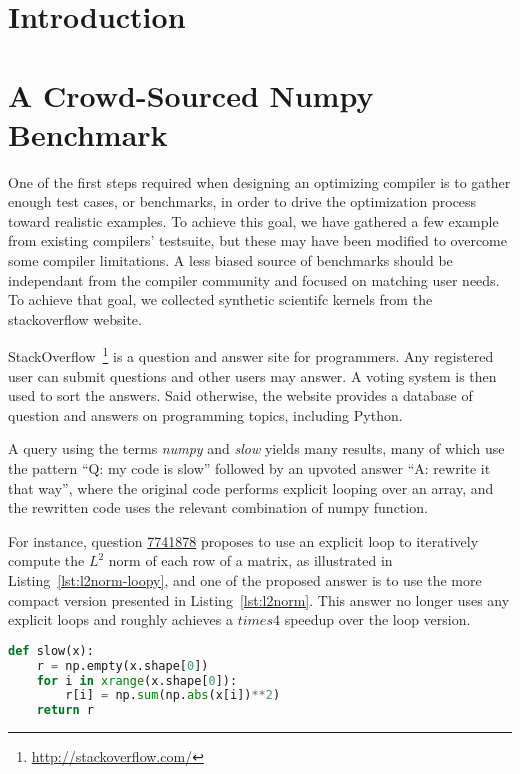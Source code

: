 \documentclass[10pt, preprint]{sigplanconf}
\begin{document}
\section{Introduction}

\cite{rossum97, scipy}

\section{A Crowd-Sourced Numpy Benchmark}

One of the first steps required when designing an optimizing compiler is to
gather enough test cases, or benchmarks, in order to drive the optimization
process toward realistic examples. To achieve this goal, we have gathered a few
example from existing compilers' testsuite, but these may have been modified to
overcome some compiler limitations. A less biased source of benchmarks should
be independant from the compiler community and focused on matching user needs.
To achieve that goal, we collected synthetic scientifc kernels from the
stackoverflow website.

StackOverflow~\footnote{\url{http://stackoverflow.com/}} is a question and
answer site for programmers. Any registered user can submit questions and other
users may answer. A voting system is then used to sort the answers. Said
otherwise, the website provides a database of question and answers on
programming topics, including Python.

A query using the terms \emph{numpy} and \emph{slow} yields many results, many
of which use the pattern ``Q: my code is slow'' followed by an upvoted answer
``A: rewrite it that way'', where the original code performs explicit looping
over an array, and the rewritten code uses the relevant combination of numpy
function.

For instance, question \href{http://stackoverflow.com/questions/7741878}{7741878}
proposes to use an explicit loop to iteratively compute the $L^2$ norm of each
row of a matrix, as illustrated in Listing~\ref{lst:l2norm-loopy}, and one of
the proposed answer is to use the more compact version presented in
Listing~\ref{lst:l2norm}. This answer no longer uses any explicit loops and
roughly achieves a $times 4$ speedup over the loop version.

\begin{lstlisting}[language=python,caption={Per row version of $L^2$ norm with loop in numpy.}, float, label={lst:l2norm-loopy}]
def slow(x):
    r = np.empty(x.shape[0])
    for i in xrange(x.shape[0]):
        r[i] = np.sum(np.abs(x[i])**2)
    return r
\end{lstlisting}
\end{document}
